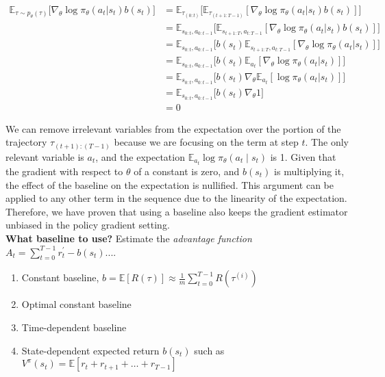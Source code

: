 \begin{equation}\label{eqn:reinforce-baseline-unbiased}
   \begin{split}
        \mathbb{E}_{\tau\sim p_{\theta}(\tau)}\big[\nabla_{\theta}\log\pi_{\theta}(a_t|s_t) b(s_t) \big] &=  \mathbb{E}_{\tau_{(0:t)}}\big[\mathbb{E}_{\tau_{(t+1:T-1)}}[ \nabla_{\theta}\log \pi_{\theta}(a_{t}|s_{t})b(s_{t})]\big]  \\
        &= \mathbb{E}_{s_{0:t}, a_{0:t-1}}\big[\mathbb{E}_{s_{t+1:T}, a_{t:T-1}}[ \nabla_{\theta}\log \pi_{\theta}(a_{t}|s_{t})b(s_{t})]\big] \\
        &= \mathbb{E}_{s_{0:t}, a_{0:t-1}}\big[b(s_{t})\mathbb{E}_{s_{t+1:T}, a_{t:T-1}}[ \nabla_{\theta}\log \pi_{\theta}(a_{t}|s_{t})]\big] \\
        &= \mathbb{E}_{s_{0:t}, a_{0:t-1}}\big[b(s_{t})\mathbb{E}_{a_{t}}[ \nabla_{\theta}\log \pi_{\theta}(a_{t}|s_{t})]\big] \\
        &= \mathbb{E}_{s_{0:t}, a_{0:t-1}}\big[b(s_{t})\nabla_{\theta}\mathbb{E}_{a_{t}}[\log \pi_{\theta}(a_{t}|s_{t})]\big] \\
        &= \mathbb{E}_{s_{0:t}, a_{0:t-1}}\big[b(s_{t})\nabla_{\theta}1\big] \\
        &= 0
   \end{split}
\end{equation}

\noindent We can remove irrelevant variables from the expectation over the portion of the trajectory $\tau_{(t+1):(T-1)}$ because we are focusing on the term at step $t$. The only relevant variable is $a_{t}$, and the expectation $\mathbb{E}_{a_{t}}\log\pi_{\theta}(a_{t}\mid s_{t})$ is 1. Given that the
gradient with respect to $\theta$ of a constant is zero, and $b(s_{t})$ is multiplying it, the effect of the baseline on the expectation is nullified. This argument can be applied to any other term in the sequence due to the linearity of the expectation. Therefore, we have proven that using a baseline also keeps the gradient estimator unbiased in the policy gradient setting. \\

\noindent \textbf{What baseline to use?} Estimate the \textit{advantage function} $A_{t} = \sum_{t=0}^{T-1} r_{t}^{'}-b(s_{t})$....

\begin{enumerate}
    \item Constant baseline, $b=\mathbb{E}\left[ R(\tau)\right]\approx \frac{1}{m}\sum_{t=0}^{T-1} R(\tau^{(i)})$
    \item Optimal constant baseline
    \item Time-dependent baseline
    \item State-dependent expected return $b(s_{t})$ such as $V^{\pi}(s_{t})=\mathbb{E}\left[ r_{t} + r_{t+1} + \dots + r_{T-1}\right]$
\end{enumerate}

